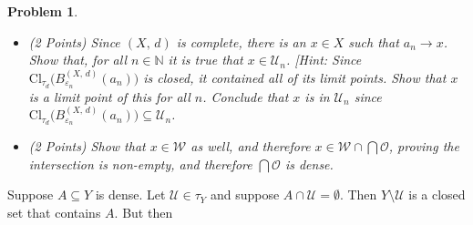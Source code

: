 \documentclass{article}
\theoremstyle{normal}
\newtheorem{problem}{Problem}
\begin{document}
\begin{problem}
\begin{itemize}
                such that
                $B_{r_{0}}^{(X,\,d)}(a_{0})\subseteq\mathcal{U}_{0}\cap\mathcal{W}$.
                By the previous part of the problem, there is a positive
                $\varepsilon_{0}<r_{0}$ such that
                $\textrm{Cl}_{\tau_{d}}\big(B_{\varepsilon_{0}}^{(X,\,d)}(a_{0})\big)\subseteq{B}_{r_{0}}^{(X,\,d)}(a_{0})$.
                Recursively we may define $a_{n}$, $r_{n}$, and
                $\varepsilon_{n}$ such that $r_{n}<\frac{1}{n+1}$,
                $\varepsilon_{n}<r_{n}$, and $a_{n}$ is such that:
                \begin{equation}
                    \textrm{Cl}_{\tau_{d}}
                        \big(B_{\varepsilon_{n}}^{(X,\,d)}(a_{n})\big)
                    \subseteq{B}_{r_{n}}^{(X,\,d)}(a_{n})
                    \subseteq\mathcal{W}\cap\bigcap_{k=0}^{n}\mathcal{U}_{n}
                \end{equation}
                and such that:
                \begin{equation}
                    \textrm{Cl}_{\tau_{d}}
                        \big(B_{\varepsilon_{n+1}}^{(X,\,d)}(a_{n+1})\big)
                        \subseteq{B}_{r_{n}}^{(X,\,d)}(a_{n})
                \end{equation}
                Show that $a:\mathbb{N}\rightarrow{X}$ is a Cauchy sequence.
            \item (2 Points) Since $(X,\,d)$ is complete, there is an $x\in{X}$ such that
                $a_{n}\rightarrow{x}$. Show that, for all $n\in\mathbb{N}$ it
                is true that $x\in\mathcal{U}_{n}$.
                [Hint: Since $\textrm{Cl}_{\tau_{d}}\big(B_{\varepsilon_{n}}^{(X,\,d)}(a_{n})\big)$
                is closed, it contained all of its limit points. Show that
                $x$ is a limit point of this for all $n$. Conclude that
                $x$ is in $\mathcal{U}_{n}$ since
                $\textrm{Cl}_{\tau_{d}}\big(B_{\varepsilon_{n}}^{(X,\,d)}(a_{n})\big)\subseteq\mathcal{U}_{n}$.
            \item (2 Points) Show that $x\in\mathcal{W}$ as well, and therefore
                $x\in\mathcal{W}\cap\bigcap\mathcal{O}$, proving the intersection
                is non-empty, and therefore $\bigcap\mathcal{O}$ is dense.
        \end{itemize}
    \end{problem}
    \color{black}
    Suppose $A\subseteq{Y}$ is dense. Let $\mathcal{U}\in\tau_{Y}$ and
    suppose $A\cap\mathcal{U}=\emptyset$. Then
    $Y\setminus\mathcal{U}$ is a closed set that contains $A$. But then
\end{document}
